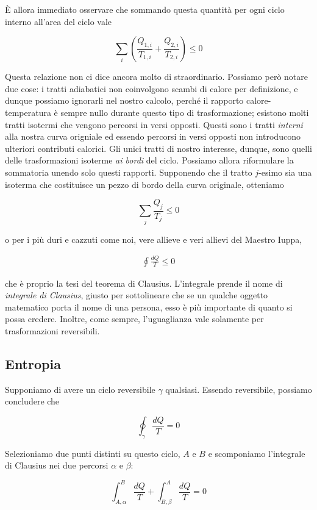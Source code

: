 \noindent È allora immediato osservare che sommando questa quantità
per ogni ciclo interno all'area del ciclo vale

\[ \sum_{i} \left(\frac{Q_{1,i}}{T_{1,i}} + \frac{Q_{2,i}}{T_{2,i}}\right) \leq 0\]

\noindent Questa relazione non ci dice ancora molto di straordinario.
Possiamo però notare due cose: i tratti adiabatici non coinvolgono
scambi di calore per definizione, e dunque possiamo ignorarli nel
nostro calcolo, perché il rapporto calore-temperatura è sempre nullo
durante questo tipo di trasformazione; esistono molti tratti isotermi
che vengono percorsi in versi opposti. Questi sono i tratti \textit{interni}
alla nostra curva origniale ed essendo percorsi in versi opposti non
introducono ulteriori contributi calorici. Gli unici tratti di nostro
interesse, dunque, sono quelli delle trasformazioni isoterme \textit{ai
bordi} del ciclo. Possiamo allora riformulare la sommatoria unendo
solo questi rapporti. Supponendo che il tratto $j$-esimo sia una isoterma
che costituisce un pezzo di bordo della curva originale, otteniamo

\[ \sum_{j} \frac{Q_j}{T_j} \leq 0 \]

\noindent o per i più duri e cazzuti come noi, vere allieve e veri allievi
del Maestro Iuppa,

\begin{align}
    \oint \frac{dQ}{T} \leq 0
\end{align}

\noindent che è proprio la tesi del teorema di Clausius. L'integrale
prende il nome di \textit{integrale di Clausius}, giusto per sottolineare
che se un qualche oggetto matematico porta il nome di una persona, esso è più
importante di quanto si possa credere. Inoltre, come sempre, l'uguaglianza
vale solamente per trasformazioni reversibili.

\subsection{Entropia}
Supponiamo di avere un ciclo reversibile $\gamma$ qualsiasi. Essendo
reversibile, possiamo concludere che

\[ \oint_\gamma \frac{dQ}{T} = 0 \]

\noindent Selezioniamo due punti distinti su questo ciclo, $A$ e $B$
e scomponiamo l'integrale di Clausius nei due percorsi $\alpha$ e
$\beta$:

\[ \int_{A,\alpha}^{B} \frac{dQ}{T} + \int_{B,\beta}^{A} \frac{dQ}{T} = 0 \]

